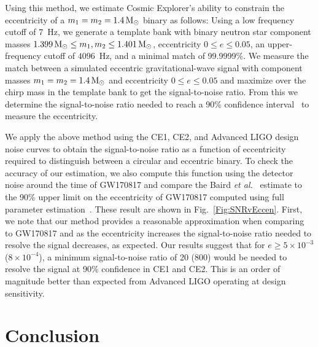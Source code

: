 Using this method, we estimate Cosmic Explorer's ability to constrain the eccentricity of a $m_1 = m_2 = 1.4\,\mathrm{M}_{\odot}$ binary as follows: Using a low frequency cutoff of $7$~Hz, we generate a template bank with binary neutron star component masses $1.399\,\mathrm{M}_{\odot} \leq m_1,m_2 \leq 1.401\,\mathrm{M}_{\odot}$, eccentricity $0 \leq e \leq 0.05$, an upper-frequency cutoff of $4096$~Hz, and a minimal match of 99.9999\%. We measure the match between a simulated eccentric gravitational-wave signal with component masses $m_1 = m_2 = 1.4\,\mathrm{M}_{\odot}$ and eccentricity $0 \leq e \leq 0.05$ and maximize over the chirp mass in the template bank to get the signal-to-noise ratio. From this we determine the signal-to-noise ratio needed to reach a 90\% confidence interval~\cite{Baird:2012cu} to measure the eccentricity.

We apply the above method using the CE1, CE2, and Advanced LIGO design noise curves to obtain the signal-to-noise ratio as a function of eccentricity required to distinguish between a circular and eccentric binary. To check the accuracy of our estimation, we also compute this function using the detector noise around the time of GW170817 and compare the Baird \textit{et al.}~\cite{Baird:2012cu} estimate to the 90\% upper limit on the eccentricity of GW170817 computed using full parameter estimation~\cite{Lenon:2020oza}. These result are shown in Fig.~\ref{Fig:SNRvEccen}. First, we note that our method provides a reasonable approximation when comparing to GW170817 and as the eccentricity increases the signal-to-noise ratio needed to resolve the signal decreases, as expected.  Our results suggest that for $e \geq 5\times10^{-3}$ ($8\times 10^{-4}$), a minimum signal-to-noise ratio of 20 (800) would be needed to resolve the signal at 90\% confidence in CE1 and CE2. This is an order of magnitude better than expected from Advanced LIGO operating at design sensitivity.


\section{\label{s:3G-conc}Conclusion}

